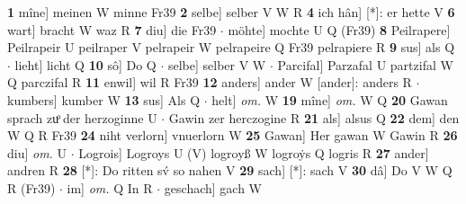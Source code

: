 \documentclass[8pt,a4paper,notitlepage]{article}
\begin{document}
\begin{table}[ht]
\begin{minipage}[t]{0.5\linewidth}
\textbf{1} mîne] meinen W minne Fr39 \textbf{2} selbe] selber V W R \textbf{4} ich hân] [*]: er hette V \textbf{6} wart] bracht W waz R \textbf{7} diu] die Fr39  $\cdot$ möhte] mochte U Q (Fr39) \textbf{8} Peilrapere] Peilrapeir U peilraper V pelrapeir W pelrapeire Q Fr39 pelrapiere R \textbf{9} sus] als Q  $\cdot$ lieht] licht Q \textbf{10} sô] Do Q  $\cdot$ selbe] selber V W  $\cdot$ Parcifal] Parzafal U partzifal W Q parczifal R \textbf{11} enwil] wil R Fr39 \textbf{12} anders] ander W [ander]: anders R  $\cdot$ kumbers] kumber W \textbf{13} sus] Als Q  $\cdot$ helt] \textit{om.} W \textbf{19} mîne] \textit{om.} W Q \textbf{20} Gawan sprach zuͦ der herzoginne U  $\cdot$ Gawin zer herczogine R \textbf{21} als] alsus Q \textbf{22} dem] den W Q R Fr39 \textbf{24} niht verlorn] vnuerlorn W \textbf{25} Gawan] Her gawan W Gawin R \textbf{26} diu] \textit{om.} U  $\cdot$ Logrois] Logroys U (V) logroyß W logroẏs Q logris R \textbf{27} ander] andren R \textbf{28} [*]: Do ritten sv́ so nahen V \textbf{29} sach] [*]: sach V \textbf{30} dâ] Do V W Q R (Fr39)  $\cdot$ im] \textit{om.} Q In R  $\cdot$ geschach] gach W \newline
\end{minipage}
\end{table}
\end{document}
